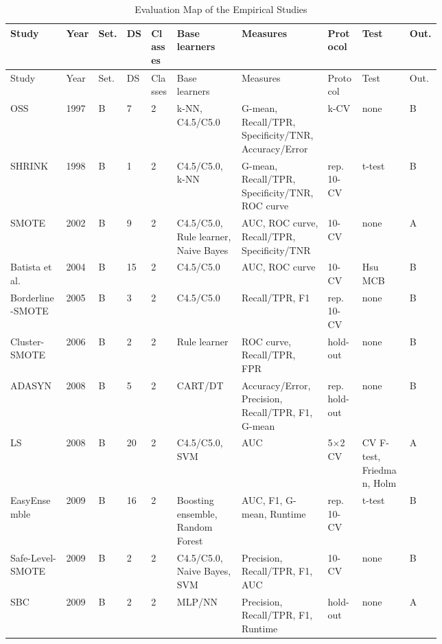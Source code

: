 \begingroup\scriptsize\setlength{\tabcolsep}{2.5pt}
\begin{longtable}{@{}p{0.13\linewidth}lllp{0.06\linewidth}p{0.15\linewidth}p{0.2\linewidth}p{0.08\linewidth}p{0.11\linewidth}l@{}}
\caption{Evaluation Map of the Empirical Studies}\label{tab:empirical-map}\\
\toprule
Study & Year & Set. & DS & Classes & Base learners & Measures & Protocol & Test & Out.\\
\midrule
\endfirsthead
\toprule
Study & Year & Set. & DS & Classes & Base learners & Measures & Protocol & Test & Out.\\
\midrule
\endhead
\bottomrule
\endfoot
OSS~\parencite{kubat1997oss} & 1997 & B & 7 & 2 & k-NN, C4.5/C5.0 & G-mean, Recall/TPR, Specificity/TNR, Accuracy/Error & k-CV & none & B\\
SHRINK~\parencite{kubat1998shrink} & 1998 & B & 1 & 2 & C4.5/C5.0, k-NN & G-mean, Recall/TPR, Specificity/TNR, ROC curve & rep. 10-CV & t-test & B\\
SMOTE~\parencite{chawla2002smote} & 2002 & B & 9 & 2 & C4.5/C5.0, Rule learner, Naive Bayes & AUC, ROC curve, Recall/TPR, Specificity/TNR & 10-CV & none & A\\
Batista et al.~\parencite{batista2004study} & 2004 & B & 15 & 2 & C4.5/C5.0 & AUC, ROC curve & 10-CV & Hsu MCB & B\\
Borderline-SMOTE~\parencite{han2005borderline} & 2005 & B & 3 & 2 & C4.5/C5.0 & Recall/TPR, F1 & rep. 10-CV & none & B\\
Cluster-SMOTE~\parencite{cieslak2006cluster} & 2006 & B & 2 & 2 & Rule learner & ROC curve, Recall/TPR, FPR & hold-out & none & B\\
ADASYN~\parencite{he2008adasyn} & 2008 & B & 5 & 2 & CART/DT & Accuracy/Error, Precision, Recall/TPR, F1, G-mean & rep. hold-out & none & B\\
LS~\parencite{cieslak2008ls} & 2008 & B & 20 & 2 & C4.5/C5.0, SVM & AUC & 5$\times$2 CV & CV F-test, Friedman, Holm & A\\
EasyEnsemble~\parencite{liu2009easyensemble} & 2009 & B & 16 & 2 & Boosting ensemble, Random Forest & AUC, F1, G-mean, Runtime & rep. 10-CV & t-test & B\\
Safe-Level-SMOTE~\parencite{bunkhumpornpat2009safelevel} & 2009 & B & 2 & 2 & C4.5/C5.0, Naive Bayes, SVM & Precision, Recall/TPR, F1, AUC & 10-CV & none & B\\
SBC~\parencite{yen2009sbc} & 2009 & B & 2 & 2 & MLP/NN & Precision, Recall/TPR, F1, Runtime & hold-out & none & A\\

\end{longtable}
